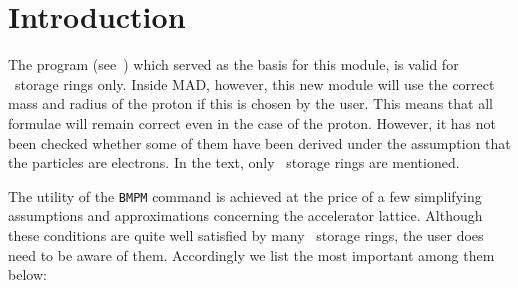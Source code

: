 \section{Introduction}
The program  (see~\cite{B-GK})
which served as the basis for this module,
is valid for \epem\ storage rings only. Inside MAD, however, this
new module will use the correct mass and radius of the proton if this
is chosen by the user. This means that all formulae will remain
correct even in the case of the proton. However, it has not been
checked whether some of them have been derived under the assumption
that the particles are electrons. In the text, only \epem\ storage
rings are mentioned.
 
The utility of the {\tt BMPM} command is achieved at the price of a few
simplifying assumptions and approximations concerning the accelerator
lattice. Although these conditions are quite well satisfied by many
\epem\ storage rings, the user does need to be aware of them.
Accordingly we list the most important among them below:
 
